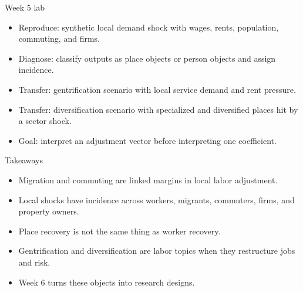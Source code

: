 \documentclass[aspectratio=169,11pt]{beamer}
\begin{document}
\begin{frame}{Week 5 lab}
\begin{itemize}
    \item Reproduce: synthetic local demand shock with wages, rents, population, commuting, and firms.
    \item Diagnose: classify outputs as place objects or person objects and assign incidence.
    \item Transfer: gentrification scenario with local service demand and rent pressure.
    \item Transfer: diversification scenario with specialized and diversified places hit by a sector shock.
    \item Goal: interpret an adjustment vector before interpreting one coefficient.
\end{itemize}
\end{frame}

\begin{frame}{Takeaways}
\begin{itemize}
    \item Migration and commuting are linked margins in local labor adjustment.
    \item Local shocks have incidence across workers, migrants, commuters, firms, and property owners.
    \item Place recovery is not the same thing as worker recovery.
    \item Gentrification and diversification are labor topics when they restructure jobs and risk.
    \item Week 6 turns these objects into research designs.
\end{itemize}
\end{frame}
\end{document}
